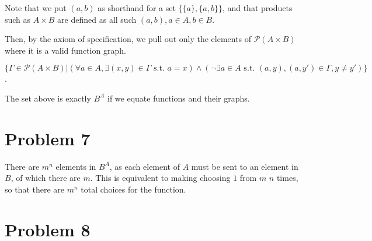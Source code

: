 \documentclass[12pt,letterpaper]{article}
\theoremstyle{definition}
\begin{document}
Note that we put $(a, b)$ as shorthand for a set $\{\{a\}, \{a,b\}\}$, and that products such as $A \times B$ are defined as all such $(a, b), a \in A, b \in B$. 

Then, by the axiom of specification, we pull out only the elements of $\mathcal{P}(A \times B)$ where it is a valid function graph. 
\begin{center}
    $\{\Gamma \in \mathcal{P}(A \times B) | (\forall a \in A, \exists (x,y) \in \Gamma \text{ s.t. } a = x)  \land (\neg\exists a \in A \text{ s.t. } (a, y), (a, y') \in \Gamma, y \neq y')\}$.
\end{center}

The set above is exactly $B^A$ if we equate functions and their graphs.

\section*{Problem 7}

There are $m^n$ elements in $B^A$, as each element of $A$ must be sent to an element in $B$, of which there are $m$. This is equivalent to making choosing $1$ from $m$ $n$ times, so that there are $m^n$ total choices for the function.

\section*{Problem 8}
\end{document}
